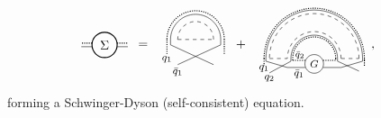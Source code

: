 \documentclass[aps,pra,reprint,superscriptaddress,twocolumn,notitlepage]{revtex4-1}
\numberwithin{equation}{section}
\begin{document}
\begin{equation}
\begin{aligned}
\tikz[baseline=-0.5ex]{
    \draw[densely dotted,thick] (0.35,0.05)--(0.65,0.05);
    \draw[densely dotted,thick] (-0.35,0.05)--(-0.65,0.05);
    \draw (0.35,-0.05)--(0.65,-0.05);
    \draw (-0.35,-0.05)--(-0.65,-0.05);
    \draw[thick] (0,0) circle (10pt) node[anchor=center] {$\Sigma$};
    }
\ \, &= \ \,
\tikz[baseline=-1.5ex]{
    \draw[dashed] (0,0) -- (1,0);
    \draw (-0.2,0.0)-- (-0.2,-0.15);
    \draw (-0.2,-0.15)-- (1.,-0.7);
    \draw (1.2,-0.15)-- (1.2,0.0);
    \draw (1.2,-0.15)-- (0,-0.7);
    \draw[densely dotted,thick] (-0.3,0.0)-- (-0.3,-0.4);
    \draw[densely dotted,thick] (1.3,-0.4)-- (1.3,0.0);
    \draw[dashed] (1,0) arc (0:180:0.5);
    \draw (1.2,0) arc (0:180:0.7);
    \draw[densely dotted,thick] (1.3,0) arc (0:180:0.8);
    \draw (-0.,-0.9) circle (0.) node[anchor=center] {\footnotesize$\bar{q}_1$};
    \draw (-0.3,-0.55) circle (0.) node[anchor=center] {\footnotesize$q_1$};
    }
\ \
+
 \ \,
\tikz[scale=0.5,baseline=2ex]{
    \draw[dashed] (0,0) -- (1,0);
    \draw (-0.2,0.)-- (-0.2,-0.15);
    \draw (-0.2,-0.15)-- (1.,-0.5);
    \draw (1.2,-0.15)-- (1.2,0.0);
    \draw (1.2,-0.15)-- (0,-0.8);
    \draw[densely dotted,thick] (-0.3,0.)-- (-0.3,-0.4);
    \draw[densely dotted,thick] (1.3,-0.1)-- (1.3,0.);
    \draw[dashed] (4,0) -- (5,0);
    \draw (3.8,0.)-- (3.8,-0.15);
    \draw (3.8,-0.15)-- (5.,-0.7);
    \draw (5.2,-0.15)-- (5.2,0.);
    \draw (5.2,-0.15)-- (4,-0.5);
    \draw[densely dotted,thick] (3.7,0.)-- (3.7,-0.1);
    \draw[densely dotted,thick] (5.3,-0.1)-- (5.3,0.);
    \draw[densely dotted,thick] (5.3,-0.4)-- (5.3,0.);
    \draw[densely dotted,thick] (1.3,-0.1)--(2,-0.1);
    \draw[densely dotted,thick] (3,-0.1)--(3.7,-0.1);
    \draw (1.0,-0.5)-- (2,-0.5);
    \draw (3.0,-0.5)-- (4,-0.5);
    \draw[densely dotted,thick] (3.7,0) arc (0:180:1.2);
    \draw[densely dotted,thick] (5.3,0) arc (0:180:2.8);
    \draw[dashed] (5.,0) arc (0:180:2.5);
    \draw[dashed] (4.,0) arc (0:180:1.5);
    \draw (3.8,0) arc (0:180:1.3);
    \draw (5.2,0) arc (0:180:2.7);
    \draw (2.5,-0.3) circle (.52) node[anchor=center] {\footnotesize$G$};
    \draw (-0.,-1.1) circle (0.) node[anchor=center] {\footnotesize$q_2$};
    \draw (-0.3,-0.55) circle (0.) node[anchor=center] {\footnotesize$q_1$};
    \draw (1.65,-0.85) circle (0.) node[anchor=center] {\footnotesize$\bar{q}_1$};
    \draw (1.7,0.2) circle (0.) node[anchor=center] {\scriptsize$\bar{q}_2$};
 } \ \, ,
\end{aligned}
\end{equation}
%
forming a Schwinger-Dyson (self-consistent) equation. 
\end{document}
